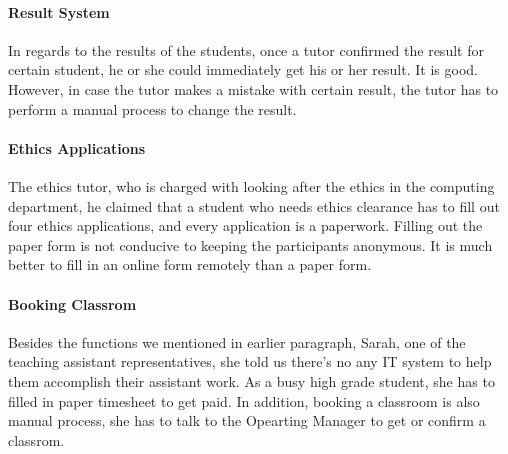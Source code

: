 \paragraph{Result System} In regards to the results of the students, once a tutor confirmed the result for certain student, he or she could immediately get his or her result. It is good. However, in case the tutor makes a mistake with certain result, the tutor has to perform a manual process to change the result. 

\paragraph{Ethics Applications} The ethics tutor, who is charged with looking after the ethics in the computing department, he claimed that a student who needs ethics clearance has to fill out four ethics applications, and every application is a paperwork. Filling out the paper form is not conducive to keeping the participants anonymous. It is much better to fill in an online form remotely than a paper form.

\paragraph{Booking Classrom} Besides the functions we mentioned in earlier paragraph, Sarah, one of the teaching assistant representatives, she told us there's no any IT system to help them accomplish their assistant work. As a busy high grade student, she has to filled in paper timesheet to get paid. In addition, booking a classroom is also manual process, she has to talk to the Opearting Manager to get or confirm a classrom.



